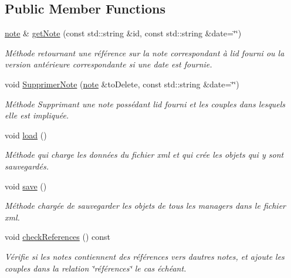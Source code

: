 \subsection*{Public Member Functions}
\begin{DoxyCompactItemize}
\item 
\hyperlink{classnote}{note} \& \hyperlink{class_notes_manager2_a53819d123894c31bbbab66b3d0bf0ff0}{get\+Note} (const std\+::string \&id, const std\+::string \&date=\char`\"{}\char`\"{})
\begin{DoxyCompactList}\small\item\em Méthode retournant une référence sur la note correspondant à l\textquotesingle{}id fourni ou la version antérieure correspondante si une date est fournie. \end{DoxyCompactList}\item 
void \hyperlink{class_notes_manager2_ac020f8488f0f71f92de1e8131a64d943}{Supprimer\+Note} (\hyperlink{classnote}{note} \&to\+Delete, const std\+::string \&date=\char`\"{}\char`\"{})
\begin{DoxyCompactList}\small\item\em Méthode Supprimant une note possédant l\textquotesingle{}id fourni et les couples dans lesquels elle est impliquée. \end{DoxyCompactList}\item 
void \hyperlink{class_notes_manager2_a2248b5b1620b2039fdba9b3c6476c6cc}{load} ()
\begin{DoxyCompactList}\small\item\em Méthode qui charge les données du fichier xml et qui crée les objets qui y sont sauvegardés. \end{DoxyCompactList}\item 
void \hyperlink{class_notes_manager2_a03224a8a150d7d7a40a6633ab2afc7c0}{save} ()
\begin{DoxyCompactList}\small\item\em Méthode chargée de sauvegarder les objets de tous les managers dans le fichier xml. \end{DoxyCompactList}\item 
\mbox{\label{class_notes_manager2_a41ec18388f556565d78794ae042511b2}} 
void \hyperlink{class_notes_manager2_a41ec18388f556565d78794ae042511b2}{check\+References} () const
\begin{DoxyCompactList}\small\item\em Vérifie si les notes contiennent des références vers d\textquotesingle{}autres notes, et ajoute les couples dans la relation \char`\"{}références\char`\"{} le cas échéant. \end{DoxyCompactList}\end{DoxyCompactItemize}

